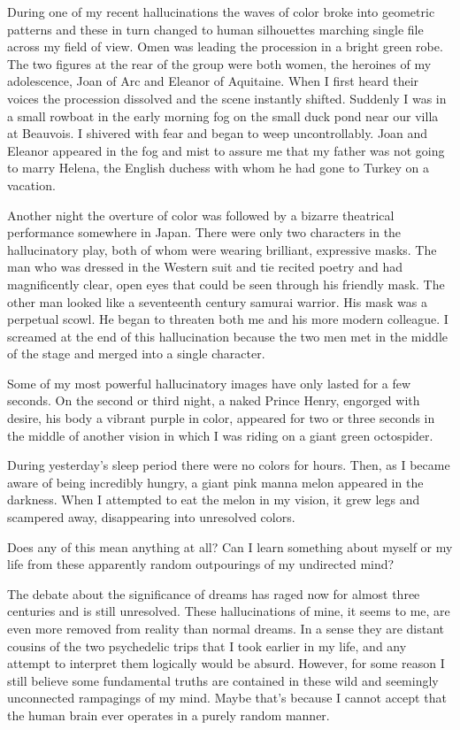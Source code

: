 \documentclass[]{article}
\begin{document}
During one of my recent hallucinations the waves of color broke into geometric patterns and these in turn changed to human silhouettes marching single file across my field of view.  Omen was leading the procession in a bright green robe.  The two figures at the rear of the group were both women, the heroines of my adolescence, Joan of Arc and Eleanor of Aquitaine.  When I first heard their voices the procession dissolved and the scene instantly shifted.  Suddenly I was in a small rowboat in the early morning fog on the small duck pond near our villa at Beauvois.  I shivered with fear and began to weep uncontrollably.  Joan and Eleanor appeared in the fog and mist to assure me that my father was not going to marry Helena, the English duchess with whom he had gone to Turkey on a vacation.

Another night the overture of color was followed by a bizarre theatrical performance somewhere in Japan.  There were only two characters in the hallucinatory play, both of whom were wearing brilliant, expressive masks.  The man who was dressed in the Western suit and tie recited poetry and had magnificently clear, open eyes that could be seen through his friendly mask.  The other man looked like a seventeenth century samurai warrior.  His mask was a perpetual scowl.  He began to threaten both me and his more modern colleague.  I screamed at the end of this hallucination because the two men met in the middle of the stage and merged into a single character.

Some of my most powerful hallucinatory images have only lasted for a few seconds.  On the second or third night, a naked Prince Henry, engorged with desire, his body a vibrant purple in color, appeared for two or three seconds in the middle of another vision in which I was riding on a giant green octospider.

During yesterday’s sleep period there were no colors for hours.  Then, as I became aware of being incredibly hungry, a giant pink manna melon appeared in the darkness.  When I attempted to eat the melon in my vision, it grew legs and scampered away, disappearing into unresolved colors.

Does any of this mean anything at all? Can I learn something about myself or my life from these apparently random outpourings of my undirected mind?

The debate about the significance of dreams has raged now for almost three centuries and is still unresolved.  These hallucinations of mine, it seems to me, are even more removed from reality than normal dreams.  In a sense they are distant cousins of the two psychedelic trips that I took earlier in my life, and any attempt to interpret them logically would be absurd.  However, for some reason I still believe some fundamental truths are contained in these wild and seemingly unconnected rampagings of my mind.  Maybe that’s because I cannot accept that the human brain ever operates in a purely random manner.
\end{document}
